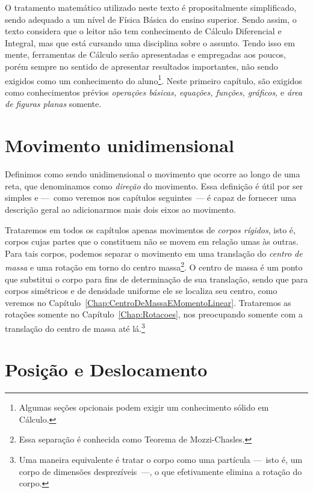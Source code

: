 O tratamento matemático utilizado neste texto é propositalmente simplificado, sendo adequado a um nível de Física Básica do ensino superior. Sendo assim, o texto considera que o leitor não tem conhecimento de Cálculo Diferencial e Integral, mas que está cursando uma disciplina sobre o assunto. Tendo isso em mente, ferramentas de Cálculo serão apresentadas e empregadas aos poucos, porém sempre no sentido de apresentar resultados importantes, não sendo exigidos como um conhecimento do aluno\footnote{Algumas seções opcionais podem exigir um conhecimento sólido em Cálculo.}. Neste primeiro capítulo, são exigidos como conhecimentos prévios \emph{operações básicas, equações, funções, gráficos,} e \emph{área de figuras planas} somente.

\section{Movimento unidimensional}

Definimos como sendo unidimensional o movimento que ocorre ao longo de uma reta, que denominamos como \emph{direção} do movimento. Essa definição é útil por ser simples e ---~como veremos nos capítulos seguintes~--- é capaz de fornecer uma descrição geral ao adicionarmos mais dois eixos ao movimento.

Trataremos em todos os capítulos apenas movimentos de \emph{corpos rígidos}, isto é, corpos cujas partes que o constituem não se movem em relação umas às outras. Para tais corpos, podemos separar o movimento em uma translação do \emph{centro de massa} e uma rotação em torno do centro massa\footnote[][-2cm]{Essa separação é conhecida como Teorema de Mozzi-Chasles.}. O centro de massa é um ponto que substitui o corpo para fins de determinação de sua translação, sendo que para corpos simétricos e de densidade uniforme ele se localiza seu centro, como veremos no Capítulo~\ref{Chap:CentroDeMassaEMomentoLinear}. Trataremos as rotações somente no Capítulo~\ref{Chap:Rotacoes}, nos preocupando somente com a translação do centro de massa até lá.\footnote[][-3cm]{Uma maneira equivalente é tratar o corpo como uma partícula ---~isto é, um corpo de dimensões desprezíveis~---, o que efetivamente elimina a rotação do corpo.}

\section{Posição e Deslocamento}

